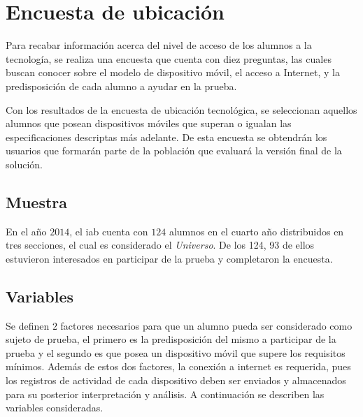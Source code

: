
\section{Encuesta de ubicación}
\label{sec:ubicacion}

Para recabar información acerca del nivel de acceso  de los alumnos a la
tecnología, se realiza una encuesta que cuenta con diez preguntas, las cuales
buscan conocer sobre el modelo de dispositivo móvil, el acceso a
Internet, y la predisposición de cada alumno a ayudar en la prueba.

Con los resultados de la encuesta de ubicación tecnológica, se seleccionan
aquellos alumnos que posean dispositivos móviles que superan o igualan las
especificaciones descriptas más adelante. De esta encuesta se obtendrán los 
usuarios que formarán parte de la población que evaluará la versión final de 
la solución.

\subsection{Muestra}

En el año $2014$, el \Gls{iab} cuenta con $124$ alumnos en el cuarto año distribuidos en
tres secciones, el cual es considerado el \emph{Universo}. De los 124, 93 de
ellos estuvieron interesados en participar de la prueba y completaron la encuesta.

\subsection{Variables}

Se definen $2$ factores necesarios para que un alumno pueda ser considerado como
sujeto de prueba, el primero es la predisposición del mismo a participar de la
prueba y el segundo es que posea un dispositivo móvil que supere los requisitos
mínimos. Además de estos dos factores, la conexión a internet es requerida, pues 
los registros de actividad de cada dispositivo deben ser enviados y almacenados 
para su posterior interpretación y análisis. A continuación se describen las variables 
consideradas.


